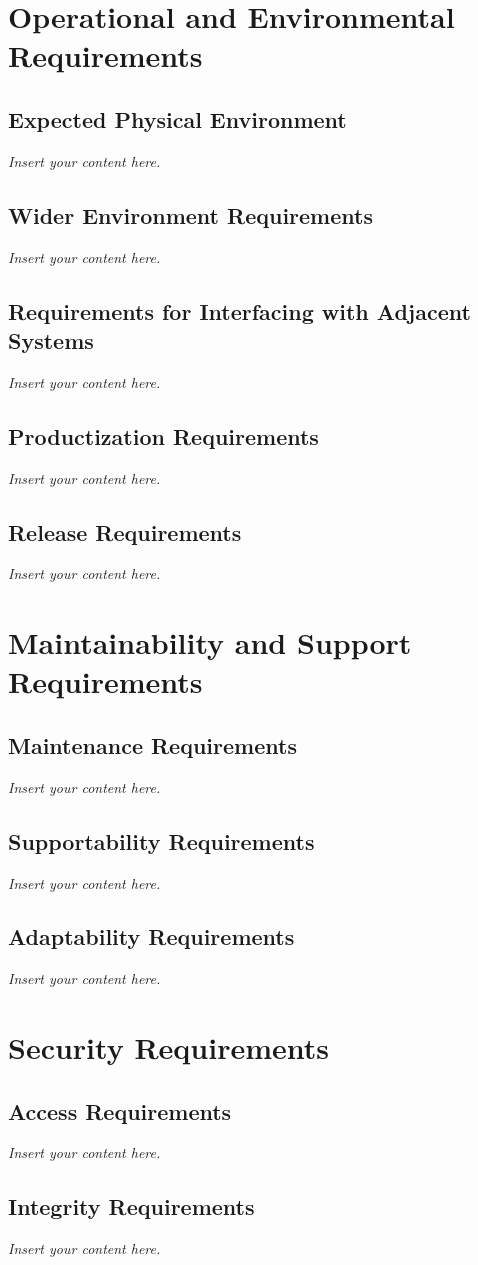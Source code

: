 \documentclass[12pt]{article}
\newcommand{\lips}{\textit{Insert your content here.}}
\begin{document}
\section{Operational and Environmental Requirements}
\subsection{Expected Physical Environment}
\lips
\subsection{Wider Environment Requirements}
\lips
\subsection{Requirements for Interfacing with Adjacent Systems}
\lips
\subsection{Productization Requirements}
\lips
\subsection{Release Requirements}
\lips

\section{Maintainability and Support Requirements}
\subsection{Maintenance Requirements}
\lips
\subsection{Supportability Requirements}
\lips
\subsection{Adaptability Requirements}
\lips

\section{Security Requirements}
\subsection{Access Requirements}
\lips
\subsection{Integrity Requirements}
\lips
\end{document}
